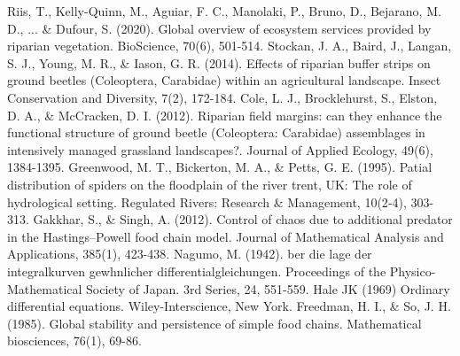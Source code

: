 \documentclass[12pt]{article}
\numberwithin{equation}{section}
\begin{document}
\begin{thebibliography}{99}
  Riis, T., Kelly-Quinn, M., Aguiar, F. C., Manolaki, P., Bruno, D., Bejarano, M. D., ... \& Dufour, S. (2020). Global overview of ecosystem services provided by riparian vegetation. BioScience, 70(6), 501-514.
  Stockan, J. A., Baird, J., Langan, S. J., Young, M. R., \& Iason, G. R. (2014). Effects of riparian buffer strips on ground beetles (Coleoptera, Carabidae) within an agricultural landscape. Insect Conservation and Diversity, 7(2), 172-184.
  Cole, L. J., Brocklehurst, S., Elston, D. A., \& McCracken, D. I. (2012). Riparian field margins: can they enhance the functional structure of ground beetle (Coleoptera: Carabidae) assemblages in intensively managed grassland landscapes?. Journal of Applied Ecology, 49(6), 1384-1395.
  Greenwood, M. T., Bickerton, M. A., \& Petts, G. E. (1995). Patial distribution of spiders on the floodplain of the river trent, UK: The role of hydrological setting. Regulated Rivers: Research \& Management, 10(2‐4), 303-313.
  Gakkhar, S., \& Singh, A. (2012). Control of chaos due to additional predator in the Hastings–Powell food chain model. Journal of Mathematical Analysis and Applications, 385(1), 423-438.
  Nagumo, M. (1942). ber die lage der integralkurven gewhnlicher differentialgleichungen. Proceedings of the Physico-Mathematical Society of Japan. 3rd Series, 24, 551-559.
  Hale JK (1969) Ordinary differential equations. Wiley-Interscience, New York.
  Freedman, H. I., \& So, J. H. (1985). Global stability and persistence of simple food chains. Mathematical biosciences, 76(1), 69-86.
\end{thebibliography}
\end{document}
